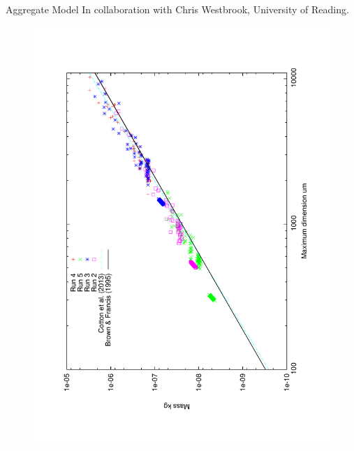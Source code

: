 \documentclass[12pt]{beamer}
\begin{document}
\begin{frame}{Aggregate Model}
In collaboration with Chris Westbrook, University of Reading.
\vspace{-1cm}
\begin{figure}
    \centering
    \includegraphics[angle=270, width = \textwidth]{Figures/mass_dimension_aggregates.pdf}
\end{figure}
\end{frame}
\end{document}
